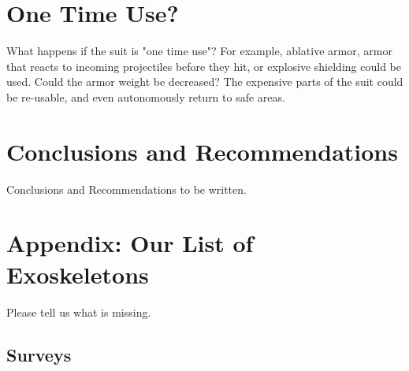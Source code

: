 \documentclass[letterpaper,12pt,fullpage]{article}
\begin{document}
\section{One Time Use?}

What happens if the suit is "one time use"? For example, ablative armor,
armor that reacts to incoming projectiles before they hit,
or explosive shielding could be used. Could the armor weight be decreased?
The expensive parts of the suit could be re-usable, and even autonomously
return to safe areas.

\section{Conclusions and Recommendations}

Conclusions and Recommendations to be written.




\newpage

\section{Appendix: Our List of Exoskeletons}

Please tell us what is missing.

\subsection{Surveys}
\end{document}
